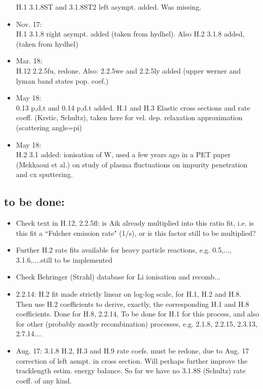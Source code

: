 \documentclass[12pt,dvipdfmx]{article}
\begin{document}
\begin{itemize}
H.1  3.1.8ST  and 3.1.8ST2  left asympt. added. Was missing.
\item Nov. 17: \\
H.1  3.1.8 right asympt. added (taken from hydhel). Also H.2  3.1.8 added, (taken from hydhel)
\item Mar. 18: \\
H.12  2.2.5fu, redone. Also: 2.2.5we and 2.2.5ly added (upper werner and lyman band
states pop. coef.)
\item May 18: \\
0.13 p,d,t and 0.14 p,d.t added. H.1 and H.3 Elastic cross sections and rate coeff.
(Krstic, Schultz), taken here for vel. dep. relaxation approximation (scattering angle=pi)
\item May 18: \\
H.2  3.1 added: ionisation of W, used a few years ago in a PET paper (Mekkaoui et al.)
on study of plasma
fluctuations on impurity penetration and cx sputtering.
\end{itemize}

\subsection{to be done:}
\begin{itemize}
\item  Check text in H.12, 2.2.5fl:  is Aik already multiplied into this ratio fit, i.e. is
this fit a ``Fulcher emission rate" (1/s), or is this factor still to be multiplied?
\item  Further H.2 rate fits available for heavy particle reactions, e.g. 0.5,..., 3.1.6,....still to be implemented
\item  Check Behringer (Strahl) database for Li ionisation and recomb...
\item 2.2.14: H.2 fit made strictly linear on log-log scale, for H.1, H.2 and H.8. Then use H.2 coefficients to
derive, exactly, the corresponding H.1 and H.8 coefficients. Done for H.8, 2.2.14,  To be done for H.1 for this
process, 
and also for other (probably mostly recombination) processes, e.g. 2.1.8, 2.2.15, 2.3.13, 2.7.14....
\item  Aug. 17:   3.1.8  H.2, H.3 and H.9 rate coefs. must be redone, due to Aug. 17 correction of left asmpt. in cross section.
Will perhaps further improve the tracklength estim. energy balance.
So far we have no 3.1.8S (Schultz) rate coeff. of any kind.
\end{itemize}
\end{document}
